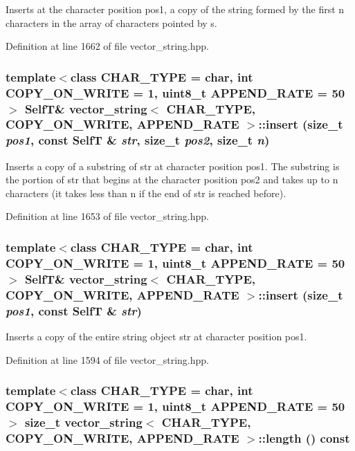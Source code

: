 Inserts at the character position pos1, a copy of the string formed by the first n characters in the array of characters pointed by s. 

Definition at line 1662 of file vector\_\-string.hpp.\hypertarget{classvector__string_9cf16247816c7d93ecffc2b41f8cba4a}{
\subsubsection[{insert}]{\setlength{\rightskip}{0pt plus 5cm}template$<$class CHAR\_\-TYPE  = char, int COPY\_\-ON\_\-WRITE = 1, uint8\_\-t APPEND\_\-RATE = 50$>$ {\bf SelfT}\& {\bf vector\_\-string}$<$ CHAR\_\-TYPE, COPY\_\-ON\_\-WRITE, APPEND\_\-RATE $>$::insert (size\_\-t {\em pos1}, \/  const {\bf SelfT} \& {\em str}, \/  size\_\-t {\em pos2}, \/  size\_\-t {\em n})}}
\label{classvector__string_9cf16247816c7d93ecffc2b41f8cba4a}


Inserts a copy of a substring of str at character position pos1. The substring is the portion of str that begins at the character position pos2 and takes up to n characters (it takes less than n if the end of str is reached before). 

Definition at line 1653 of file vector\_\-string.hpp.\hypertarget{classvector__string_601a84cd50754d049e8bdb9d54242913}{
\subsubsection[{insert}]{\setlength{\rightskip}{0pt plus 5cm}template$<$class CHAR\_\-TYPE  = char, int COPY\_\-ON\_\-WRITE = 1, uint8\_\-t APPEND\_\-RATE = 50$>$ {\bf SelfT}\& {\bf vector\_\-string}$<$ CHAR\_\-TYPE, COPY\_\-ON\_\-WRITE, APPEND\_\-RATE $>$::insert (size\_\-t {\em pos1}, \/  const {\bf SelfT} \& {\em str})}}
\label{classvector__string_601a84cd50754d049e8bdb9d54242913}


Inserts a copy of the entire string object str at character position pos1. 

Definition at line 1594 of file vector\_\-string.hpp.\hypertarget{classvector__string_bed831c659ff65631f4f15212f1f1537}{
\subsubsection[{length}]{\setlength{\rightskip}{0pt plus 5cm}template$<$class CHAR\_\-TYPE  = char, int COPY\_\-ON\_\-WRITE = 1, uint8\_\-t APPEND\_\-RATE = 50$>$ size\_\-t {\bf vector\_\-string}$<$ CHAR\_\-TYPE, COPY\_\-ON\_\-WRITE, APPEND\_\-RATE $>$::length () const}}
\label{classvector__string_bed831c659ff65631f4f15212f1f1537}


